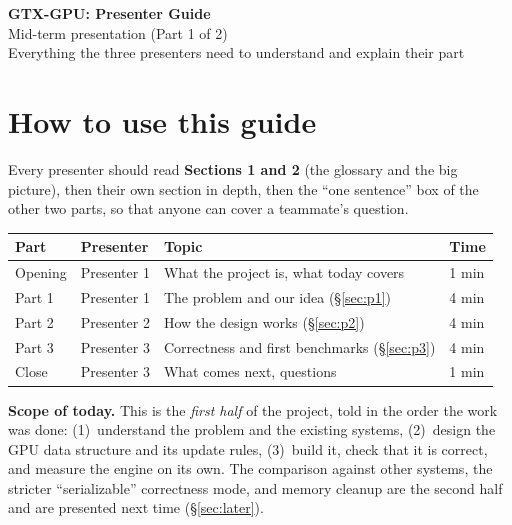 \documentclass[11pt,a4paper]{article}
\begin{document}
\begin{center}
{\Huge\bfseries\color{ink} GTX-GPU: Presenter Guide}\\[6pt]
{\Large Mid-term presentation (Part 1 of 2)}\\[4pt]
{\normalsize Everything the three presenters need to understand and explain their part}
\end{center}
\vspace{4pt}

\section*{How to use this guide}
Every presenter should read \textbf{Sections 1 and 2} (the glossary and the big picture), then their own section in
depth, then the ``one sentence'' box of the other two parts, so that anyone can cover a teammate's question.

\begin{center}
\begin{tabular}{@{}llll@{}}
\toprule
Part & Presenter & Topic & Time \\
\midrule
Opening & Presenter 1 & What the project is, what today covers & 1 min \\
Part 1 & Presenter 1 & The problem and our idea (\S\ref{sec:p1}) & 4 min \\
Part 2 & Presenter 2 & How the design works (\S\ref{sec:p2}) & 4 min \\
Part 3 & Presenter 3 & Correctness and first benchmarks (\S\ref{sec:p3}) & 4 min \\
Close & Presenter 3 & What comes next, questions & 1 min \\
\bottomrule
\end{tabular}
\end{center}

\textbf{Scope of today.} This is the \emph{first half} of the project, told in the order the work was done:
(1)~understand the problem and the existing systems, (2)~design the GPU data structure and its update rules,
(3)~build it, check that it is correct, and measure the engine on its own. The comparison against other systems, the
stricter ``serializable'' correctness mode, and memory cleanup are the second half and are presented next time
(\S\ref{sec:later}).

\tableofcontents
\newpage

\end{document}

